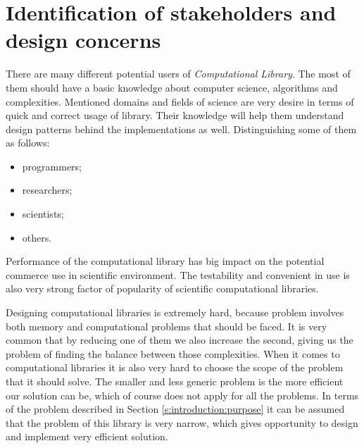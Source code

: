 \chapter{Identification of stakeholders and design concerns} \label{chp:identification-of-stakeholders-and-design-concerns}
	\begin{comment}
		An SDD shall identify the design stakeholders for the design subject.
		An SDD shall identify the design concerns of each identified design stakeholder.
		An SDD shall address each identified design concern.
		NOTE—An SDD can be used to satisfy the content guidelines for several types of design description as defined in
		ISO/IEC 15289:2006 [B25], by identifying their content guidelines as design concerns. The types of design
		descriptions are as follows: database design description (10.14),6 database detailed design description (10.15), highlevel
		software design description (10.22), interface description (10.27), low-level software design description (10.29),
		system description (10.71), and system element description (10.72).
	\end{comment}

	There are many different potential users of \emph{Computational Library}. The most of them should have a basic knowledge about computer science, algorithms and complexities. Mentioned domains and fields of science are very desire in terms of quick and correct usage of library. Their knowledge will help them understand design patterns behind the implementations as well. Distinguishing some of them as follows: 
	\begin{itemize}
		\item programmers;
		\item researchers;
		\item scientists;
		\item others.
	\end{itemize}
	Performance of the computational library has big impact on the potential commerce use in scientific environment. The testability and convenient in use is also very strong factor of popularity of scientific computational libraries. 
	
	Designing computational libraries is extremely hard, because problem involves both memory and computational problems that should be faced. It is very common that by reducing one of them we also increase the second, giving us the problem of finding the balance between those complexities. When it comes to computational libraries it is also very hard to choose the scope of the problem that it should solve. The smaller and less generic problem is the more efficient our solution can be, which of course does not apply for all the problems. In terms of the problem described in Section \ref{s:introduction:purpose} it can be assumed that the problem of this library is very narrow, which gives opportunity to design and implement very efficient solution.

